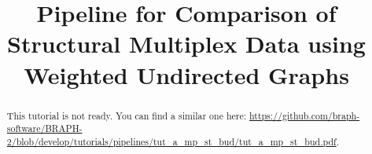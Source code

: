 \documentclass[justified]{tufte-handout}
\title[Comparison of Structural Multiplex Data using WU]{Pipeline for Comparison of Structural Multiplex Data using Weighted Undirected Graphs}
\begin{document}
\maketitle

\begin{abstract}
\noindent
This tutorial is not ready. You can find a similar one here: \url{https://github.com/braph-software/BRAPH-2/blob/develop/tutorials/pipelines/tut_a_mp_st_bud/tut_a_mp_st_bud.pdf}.
\end{abstract}
\end{document}
